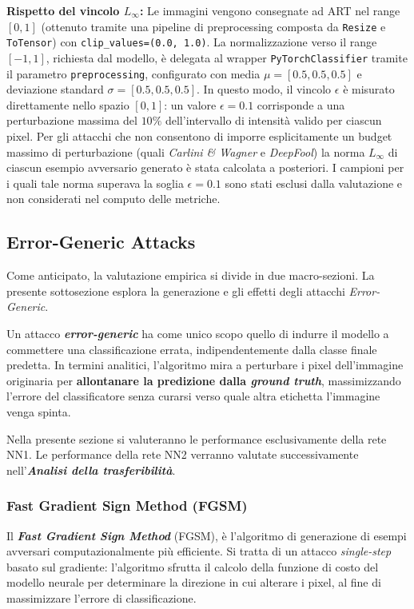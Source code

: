 \documentclass[a4paper, 12pt]{article}
\begin{document}
\textbf{Rispetto del vincolo $L_\infty$:} Le immagini vengono consegnate ad ART nel range $[0, 1]$ (ottenuto tramite una pipeline di preprocessing composta da \texttt{Resize} e \texttt{ToTensor}) con \texttt{clip\_values=(0.0, 1.0)}. La normalizzazione verso il range $[-1, 1]$, richiesta dal modello, è delegata al wrapper \texttt{PyTorchClassifier} tramite il parametro \texttt{preprocessing}, configurato con media $\mu = [0.5, 0.5, 0.5]$ e deviazione standard $\sigma = [0.5, 0.5, 0.5]$. In questo modo, il vincolo $\epsilon$ è misurato direttamente nello spazio $[0, 1]$: un valore $\epsilon = 0.1$ corrisponde a una perturbazione massima del $10\%$ dell'intervallo di intensità valido per ciascun pixel.
Per gli attacchi che non consentono di imporre esplicitamente un budget massimo di perturbazione (quali \textit{Carlini \& Wagner} e \textit{DeepFool}) la norma $L_\infty$ di ciascun esempio avversario generato è stata calcolata a posteriori. I campioni per i quali tale norma superava la soglia $\epsilon = 0.1$ sono stati esclusi dalla valutazione e non considerati nel computo delle metriche.

\vspace{15pt}

\subsection{Error-Generic Attacks}
Come anticipato, la valutazione empirica si divide in due macro-sezioni. La presente sottosezione esplora la generazione e gli effetti degli attacchi \textit{Error-Generic}. 

Un attacco \textit{\textbf{error-generic}} ha come unico scopo quello di indurre il modello a commettere una classificazione errata, indipendentemente dalla classe finale predetta. In termini analitici, l'algoritmo mira a perturbare i pixel dell'immagine originaria per \textbf{allontanare la predizione dalla \textit{ground truth}}, massimizzando l'errore del classificatore senza curarsi verso quale altra etichetta l'immagine venga spinta.

Nella presente sezione si valuteranno le performance esclusivamente della rete NN1. Le performance della rete NN2 verranno valutate successivamente nell'\textbf{\textit{Analisi della trasferibilità}}.  

\subsubsection{Fast Gradient Sign Method (FGSM)}
Il \textit{\textbf{Fast Gradient Sign Method}} (FGSM), è l'algoritmo di generazione di esempi avversari computazionalmente più efficiente. Si tratta di un attacco \textit{single-step} basato sul gradiente: l'algoritmo sfrutta il calcolo della funzione di costo del modello neurale per determinare la direzione in cui alterare i pixel, al fine di massimizzare l'errore di classificazione.
\end{document}
